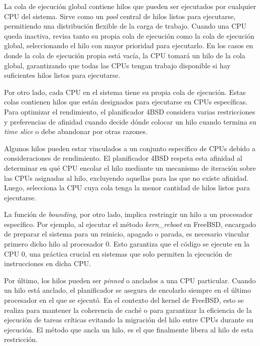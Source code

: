 La cola de ejecución global contiene hilos que pueden ser ejecutados por cualquier CPU del sistema. Sirve como un \textit{pool} central de hilos listos para ejecutarse, permitiendo una distribución flexible de la carga de trabajo. Cuando una CPU queda inactiva, revisa tanto su propia cola de ejecución como la cola de ejecución global, seleccionando el hilo con mayor prioridad para ejecutarlo. En los casos en donde la cola de ejecución propia está vacía, la CPU tomará un hilo de la cola global, garantizando que todas las CPUs tengan trabajo disponible si hay suficientes hilos listos para ejecutarse.

Por otro lado, cada CPU en el sistema tiene su propia cola de ejecución. Estas colas contienen hilos que están designados para ejecutarse en CPUs específicas. Para optimizar el rendimiento, el planificador 4BSD considera varias restricciones y preferencias de afinidad cuando decide dónde colocar un hilo cuando termina su \textit{time slice} o debe abandonar por otras razones.

Algunos hilos pueden estar vinculados a un conjunto específico de CPUs debido a consideraciones de rendimiento. El planificador 4BSD respeta esta afinidad al determinar en qué CPU encolar el hilo mediante un mecanismo de iteración sobre las CPUs asignadas al hilo, excluyendo aquellas para las que no existe afinidad. Luego, selecciona la CPU cuya cola tenga la menor cantidad de hilos listos para ejecutarse.\par

La función de \textit{bounding}, por otro lado, implica restringir un hilo a un procesador específico. Por ejemplo, al ejecutar el método \textit{kern\_reboot} en FreeBSD, encargado de preparar el sistema para un reinicio, apagado o parada, es necesario vincular primero dicho hilo al procesador 0. Esto garantiza que el código se ejecute en la CPU 0, una práctica crucial en sistemas que solo permiten la ejecución de instrucciones en dicha CPU.\par

Por último, los hilos pueden ser \textit{pinned} o anclados a una CPU particular. Cuando un hilo está anclado, el planificador se asegura de encolarlo siempre en el último procesador en el que se ejecutó. En el contexto del kernel de FreeBSD, esto se realiza para mantener la coherencia de caché o para garantizar la eficiencia de la ejecución de tareas críticas evitando la migración del hilo entre CPUs durante su ejecución. El método que ancla un hilo, es el que finalmente libera al hilo de esta restricción.\par

